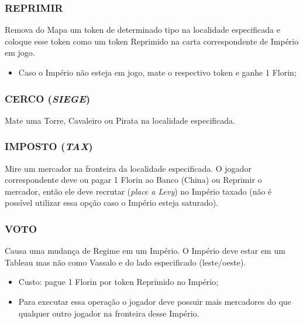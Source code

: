 \documentclass[11pt]{article}
\begin{document}
\subsubsection{REPRIMIR}
\label{sec:orgca11745}

Remova do Mapa um token de determinado tipo na localidade especificada e coloque esse token como um token Reprimido na carta correspondente de Império em jogo.

\begin{itemize}
\item Caso o Império não esteja em jogo, mate o respectivo token e ganhe 1 Florin;
\end{itemize}

\subsubsection{CERCO (\emph{SIEGE})}
\label{sec:orgea7900d}

Mate uma Torre, Cavaleiro ou Pirata na localidade especificada.

\subsubsection{IMPOSTO (\emph{TAX})}
\label{sec:orgc2e0fef}

Mire um mercador na fronteira da localidade especificada. O jogador correspondente deve ou pagar 1 Florin ao Banco (China) ou Reprimir o mercador, então ele deve recrutar (\emph{place a Levy}) no Império taxado
(não é possível utilizar essa opção caso o Império esteja saturado).

\subsubsection{VOTO}
\label{sec:org23c737f}

Causa uma mudança de Regime em um Império. O Império deve estar em um Tableau mas não como Vassalo e do lado especificado (leste/oeste).

\begin{itemize}
\item Custo: pague 1 Florin por token Reprimido no Império;

\item Para executar essa operação o jogador deve possuir mais mercadores do que qualquer outro jogador na fronteira desse Império.
\end{itemize}
\end{document}
